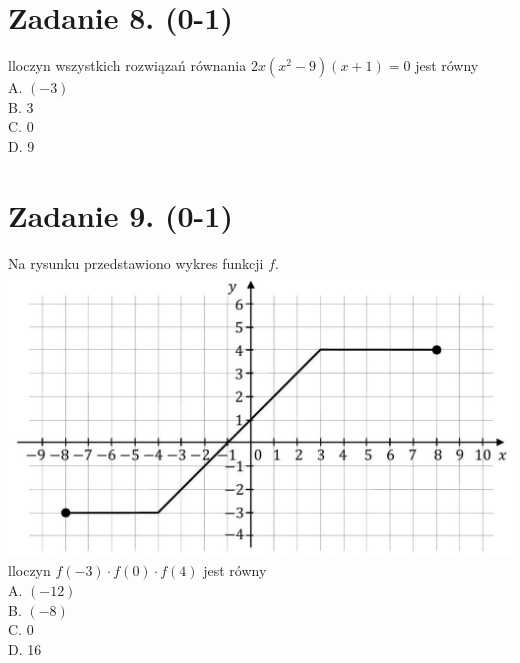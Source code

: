 \documentclass[10pt]{article}
\begin{document}
\section*{Zadanie 8. (0-1)}
lloczyn wszystkich rozwiązań równania \(2 x\left(x^{2}-9\right)(x+1)=0\) jest równy\\
A. \((-3)\)\\
B. 3\\
C. 0\\
D. 9

\section*{Zadanie 9. (0-1)}
Na rysunku przedstawiono wykres funkcji \(f\).\\
\includegraphics[max width=\textwidth, center]{2024_11_21_465acd0c12fa3e05e8a7g-04}\\
lloczyn \(f(-3) \cdot f(0) \cdot f(4)\) jest równy\\
A. \((-12)\)\\
B. \((-8)\)\\
C. 0\\
D. 16
\end{document}
